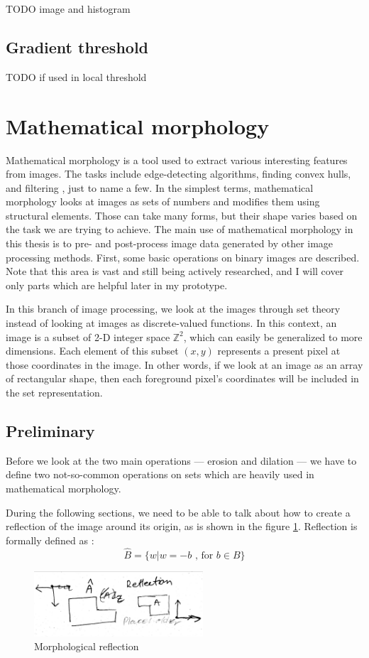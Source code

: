 \documentclass[
  digital,     %
  oneside,     %
  nosansbold,  %
  nocolorbold, %
  lof,         %
  lot,         %
]{fithesis4}
\newcommand*{\Z}{\ensuremath{\mathbb{Z}}}
\begin{document}
TODO image and histogram

\subsection{Gradient threshold}

 TODO if used in local threshold

\section{Mathematical morphology}

Mathematical morphology is a tool used to extract various interesting features
from images. The tasks include edge-detecting algorithms, finding convex hulls, and filtering
, just to name a few. In the simplest terms,
mathematical morphology looks at images as sets of numbers and modifies them using structural elements. Those can take many forms, but their shape varies based on the task we are trying
to achieve. The main use of mathematical morphology in this thesis is
to pre- and post-process image data generated by other image processing methods.
First, some basic operations on binary images are described. Note that
this area is vast and still being actively researched, and I will cover only parts which are helpful later in my
prototype.

In this branch of image processing, we look at the images through set theory
instead of looking at images as discrete-valued functions. In this context, an
image is a subset of 2-D integer space $\Z^2$, which can easily be generalized
to more dimensions. Each element of this subset $(x, y)$ represents a present
pixel at those coordinates in the image. In other words, if we look at an image
as an array of rectangular shape, then each foreground pixel's coordinates will
be included in the set representation.

\subsection{Preliminary}
Before we look at the two main operations --- erosion and dilation --- we have to
define two not-so-common operations on sets which are heavily used in
mathematical morphology.

During the following sections, we need to be able to talk about how to create a
reflection of the image around its origin, as is shown in the figure
\ref{fig:morp_refl}. Reflection is formally defined as \parencite{gonzalez2002}:
$$\hat{B} = \{w | w=-b \text{ , for } b \in B\}$$
\begin{figure}
    \begin{center}
        \includegraphics[width=6.3cm]{resources/morph_reflection.jpg}
    \end{center}
    \caption{Morphological reflection} %
    \label{fig:morp_refl}
\end{figure}
\end{document}
